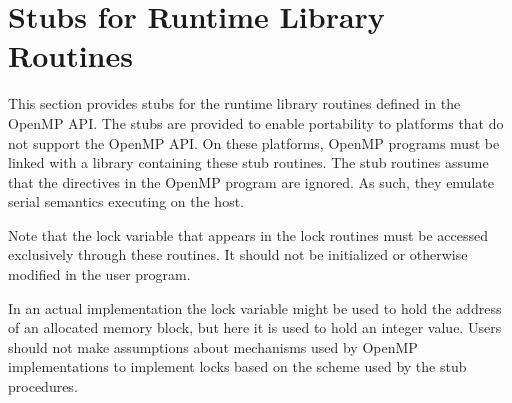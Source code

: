 %
%
%
%
%
%
%
%
%
%


\chapter{Stubs for Runtime Library Routines}
\label{chap:Stubs for Runtime Library Routines}
\label{chap:Appendix A}
This section provides stubs for the runtime library routines defined in the OpenMP API. 
The stubs are provided to enable portability to platforms that do not support the 
OpenMP API. On these platforms, OpenMP programs must be linked with a library 
containing these stub routines. The stub routines assume that the directives in the 
OpenMP program are ignored. As such, they emulate serial semantics
executing on the host.

Note that the lock variable that appears in the lock routines must be accessed 
exclusively through these routines. It should not be initialized or otherwise modified in 
the user program. 

In an actual implementation the lock variable might be used to hold the address of an 
allocated memory block, but here it is used to hold an integer value. Users should not 
make assumptions about mechanisms used by OpenMP implementations to implement 
locks based on the scheme used by the stub procedures.

